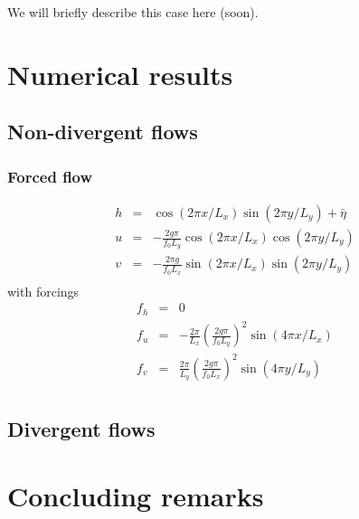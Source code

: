\documentclass[10pt,a4paper]{article}
\begin{document}
We will briefly describe this case here (soon).

\section{Numerical results}

\subsection{Non-divergent flows}

\subsubsection*{Forced flow}
\begin{eqnarray}
h&=&\cos(2 \pi x/L_x)\sin(2\pi y /L_y) + \bar{\eta}\\
u&=&-\frac{2 g \pi}{f_0 L_y} \cos(2\pi x/L_x) \cos(2\pi y /L_y)\\
v&=& -\frac{2 \pi g}{f_0 L_x} \sin(2\pi x/L_x) \sin(2\pi y/L_y)\\
\end{eqnarray}
with forcings
\begin{eqnarray}
f_h&=&0\\
f_u&=&-\frac{2\pi}{L_x}\left(\frac{2g \pi}{f_0 L_y}\right)^2 \sin(4\pi x/L_x)\\
f_v&=& \frac{2\pi}{L_y}\left(\frac{2g \pi}{f_0 L_x}\right)^2 \sin(4\pi y/L_y)\\
\end{eqnarray}

\subsection{Divergent flows}


\section{Concluding remarks}





\appendix
\end{document}
